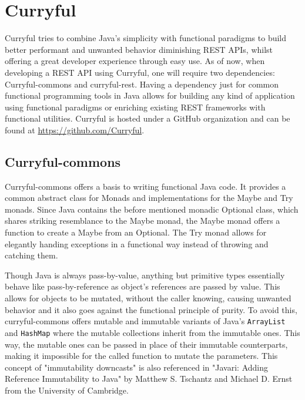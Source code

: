 \documentclass[a4paper]{article}
\begin{document}
\section{Curryful}
Curryful tries to combine Java's simplicity with functional paradigms to build
better performant and unwanted behavior diminishing REST APIs, whilst offering
a great developer experience through easy use. As of now, when developing a REST
API using Curryful, one will require two dependencies: Curryful-commons and
curryful-rest. Having a dependency just for common functional programming tools
in Java allows for building any kind of application using functional paradigms
or enriching existing REST frameworks with functional utilities. Curryful is
hosted under a GitHub organization and can be found at
\url{https://github.com/Curryful}.

\subsection{Curryful-commons}
Curryful-commons offers a basis to writing functional Java code. It provides a
common abstract class for Monads and implementations for the Maybe and Try
monads. Since Java contains the before mentioned monadic Optional class, which
shares striking resemblance to the Maybe monad, the Maybe monad offers a
function to create a Maybe from an Optional. The Try monad allows for elegantly
handing exceptions in a functional way instead of throwing and catching them.

Though Java is always pass-by-value, anything but primitive types essentially
behave like pass-by-reference as object's references are passed by value.
\cite{hott2024java} This allows for objects to be mutated, without the caller
knowing, causing unwanted behavior and it also goes against the functional
principle of purity. To avoid this, curryful-commons offers mutable and
immutable variants of Java's \verb|ArrayList| and \verb|HashMap| where the
mutable collections inherit from the immutable ones. This way, the mutable ones
can be passed in place of their immutable counterparts, making it impossible for
the called function to mutate the parameters. This concept of "immutability
downcasts" is also referenced in "Javari: Adding Reference Immutability to Java"
\cite{tschantz2005javari} by Matthew S. Tschantz and Michael D. Ernst from the
University of Cambridge.
\end{document}
